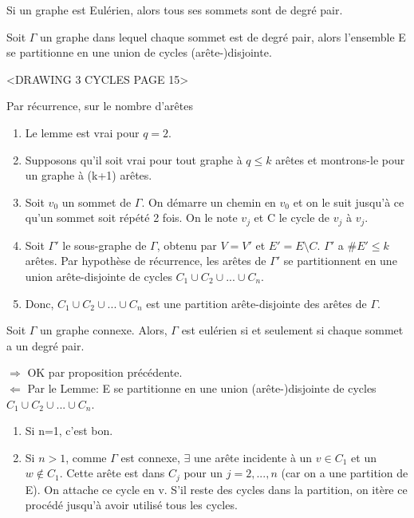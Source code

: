 \begin{prop}
Si un graphe est Eulérien, alors tous ses sommets sont de degré pair.\\
\end{prop}

\begin{lemme}
Soit $\Gamma$ un graphe dans lequel chaque sommet est de degré pair, alors l'ensemble E se partitionne en une union de cycles (arête-)disjointe.\\
\end{lemme}

\begin{exmp}
<DRAWING 3 CYCLES PAGE 15>\\
\end{exmp}

\begin{demo}
Par récurrence, sur le nombre d'arêtes
	\begin{enumerate}
		\item Le lemme est vrai pour $q=2$.
		\item Supposons qu'il soit vrai pour tout graphe à $q \leq k$ arêtes et montrons-le pour un graphe à (k+1) arêtes.
		\item Soit $v_{0}$ un sommet de $\Gamma$. On démarre un chemin en $v_{0}$ et on le suit jusqu'à ce qu'un sommet soit répété 2 fois. On le note $v_{j}$ et C le cycle de $v_{j}$ à $v_{j}$.
		\item Soit ${\Gamma}'$ le sous-graphe de $\Gamma$, obtenu par $V={V}'$ et ${E}'=E \setminus C$. ${\Gamma}'$ a $\#{E}' \leq k$ arêtes. Par hypothèse de récurrence, les arêtes de ${\Gamma}'$ se partitionnent en une union arête-disjointe de cycles $C_{1} \cup C_{2} \cup ... \cup C_{n}$.
		\item Donc, $C_{1} \cup C_{2} \cup ... \cup C_{n}$ est une partition arête-disjointe des arêtes de $\Gamma$.\\
	\end{enumerate}
\end{demo}

\begin{thrm}
Soit $\Gamma$ un graphe connexe. Alors, $\Gamma$ est eulérien si et seulement si chaque sommet a un degré pair.\\
\end{thrm}

\begin{demo}
$\Rightarrow$ OK par proposition précédente.\\
$\Leftarrow$ Par le Lemme: E se partitionne en une union (arête-)disjointe de cycles $C_{1} \cup C_{2} \cup ... \cup C_{n}$.
	\begin{enumerate}
		\item Si n=1, c'est bon.
		\item Si $n>1$, comme $\Gamma$ est connexe, $\exists$ une arête incidente à un $v \in C_{1}$ et un $w \notin C_{1}$. Cette arête est dans $C_{j}$ pour un $j=2,...,n$ (car on a une partition de E). On attache ce cycle en v. S'il reste des cycles dans la partition, on itère ce procédé jusqu'à avoir utilisé tous les cycles.\\
	\end{enumerate}
\end{demo}


